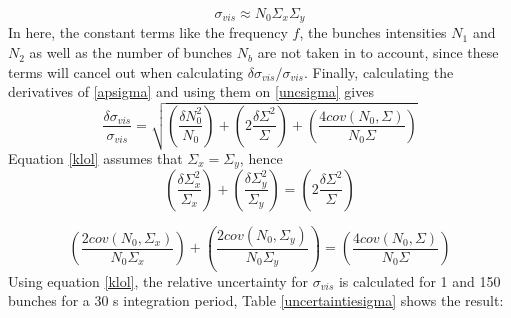\begin{equation}
    \sigma_{vis}\approx N_0\Sigma_{x}\Sigma_{y}
    \label{apsigma}
\end{equation}
In here, the constant terms like the frequency $f$, the bunches intensities $N_1$ and $N_2$ as well as the number of bunches $N_b$ are not taken in to account, since these terms will cancel out when calculating $\delta\sigma_{vis}/\sigma_{vis}$. Finally, calculating the derivatives of \ref{apsigma} and using them on \ref{uncsigma} gives
\begin{equation}
        \frac{\delta\sigma_{vis}}{\sigma_{vis}}=\sqrt{\left(\frac{\delta N_0^2}{N_0}\right)+\left(2\frac{\delta\Sigma^2}{\Sigma}\right)+\left(\frac{4 cov(N_0,\Sigma)}{N_0\Sigma}\right)}
        \label{klol}
\end{equation}
Equation \ref{klol} assumes that $\Sigma_x=\Sigma_y$, hence 
$$\left(\frac{\delta\Sigma_x^2}{\Sigma_x}\right)+\left(\frac{\delta\Sigma_y^2}{\Sigma_y}\right)=\left(2\frac{\delta\Sigma^2}{\Sigma}\right)$$

$$\left(\frac{2 cov(N_0,\Sigma_x)}{N_0\Sigma_x}\right)+\left(\frac{2 cov(N_0,\Sigma_y)}{N_0\Sigma_y}\right)=\left(\frac{4 cov(N_0,\Sigma)}{N_0\Sigma}\right)$$
Using equation  \ref{klol}, the relative uncertainty for $\sigma_{vis}$ is calculated for 1 and 150 bunches for a 30 s integration period, Table \ref{uncertaintiesigma} shows the result:


\begin{table}[H]
\centering
\caption[Results from the vdM toy study for 1 bx and 150 bx.]{Results from the vdM toy study for 1 bx and 150 bx: Table shows  mean number of cluster/coincidences per event ($N_0$), beam overlap widths $(\Sigma)$ and the uncertainties for  mean number of cluster/coincidences per event ($\delta N_0$), beam overlap widths ($\delta\Sigma$) and $\sigma_{vis}$ ($\delta\sigma_{vis}/\sigma_{vis}\%$) for Phase II luminometers. }
\label{uncertaintiesigma}
\end{table}
